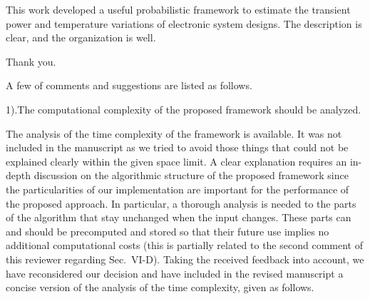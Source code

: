 \begin{reviewer}
This work developed a useful probabilistic framework to estimate the transient power and temperature variations of electronic system designs. The description is clear, and the organization is well.
\end{reviewer}
\begin{authors}
Thank you.
\end{authors}

\begin{reviewer}
A few of comments and suggestions are listed as follows.

1).The computational complexity of the proposed framework should be analyzed.
\end{reviewer}
\begin{authors}
The analysis of the time complexity of the framework is available.
It was not included in the manuscript as we tried to avoid those things that could not be explained clearly within the given space limit.
A clear explanation requires an in-depth discussion on the algorithmic structure of the proposed framework since the particularities of our implementation are important for the performance of the proposed approach.
In particular, a thorough analysis is needed to the parts of the algorithm that stay unchanged when the input changes.
These parts can and should be precomputed and stored so that their future use implies no additional computational costs (this is partially related to the second comment of this reviewer regarding Sec.~VI-D).
Taking the received feedback into account, we have reconsidered our decision and have included in the revised manuscript a concise version of the analysis of the time complexity, given as follows.


\end{authors}
